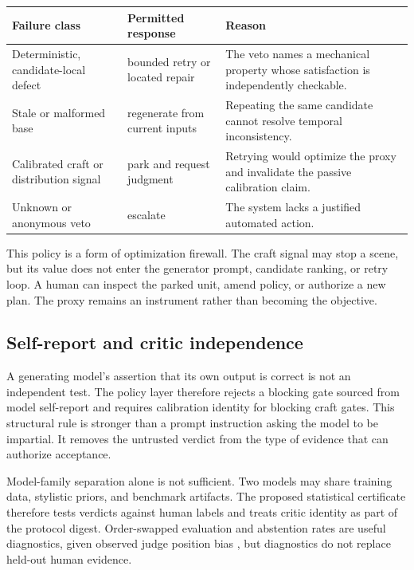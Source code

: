\documentclass[11pt]{article}
\begin{document}
\begin{center}
\begin{tabular}{p{}p{}p{}}
\toprule
Failure class & Permitted response & Reason \\
\midrule
Deterministic, candidate-local defect & bounded retry or located repair & The veto names a
mechanical property whose satisfaction is independently checkable. \\
Stale or malformed base & regenerate from current inputs & Repeating the same candidate
cannot resolve temporal inconsistency. \\
Calibrated craft or distribution signal & park and request judgment & Retrying would optimize
the proxy and invalidate the passive calibration claim. \\
Unknown or anonymous veto & escalate & The system lacks a justified automated action. \\
\bottomrule
\end{tabular}
\end{center}

This policy is a form of optimization firewall. The craft signal may stop a scene, but its
value does not enter the generator prompt, candidate ranking, or retry loop. A human can
inspect the parked unit, amend policy, or authorize a new plan. The proxy remains an
instrument rather than becoming the objective.

\subsection{Self-report and critic independence}

A generating model's assertion that its own output is correct is not an independent test.
The policy layer therefore rejects a blocking gate sourced from model self-report and
requires calibration identity for blocking craft gates. This structural rule is stronger
than a prompt instruction asking the model to be impartial. It removes the untrusted verdict
from the type of evidence that can authorize acceptance.

Model-family separation alone is not sufficient. Two models may share training data,
stylistic priors, and benchmark artifacts. The proposed statistical certificate therefore
tests verdicts against human labels and treats critic identity as part of the protocol digest.
Order-swapped evaluation and abstention rates are useful diagnostics, given observed judge
position bias \cite{zheng2023judge}, but diagnostics do not replace held-out human evidence.
\end{document}
